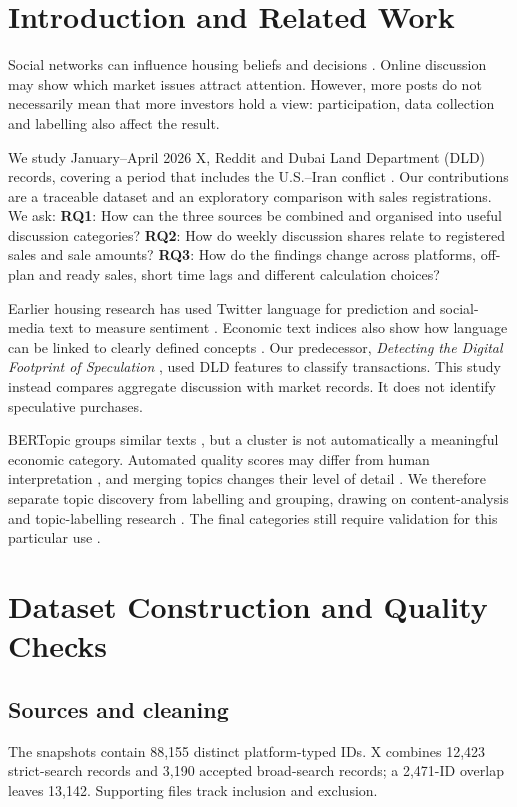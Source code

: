\documentclass[graybox]{svmult}
\begin{document}
\section{Introduction and Related Work}
Social networks can influence housing beliefs and decisions \cite{bailey2018}. Online discussion may show which market issues attract attention. However, more posts do not necessarily mean that more investors hold a view: participation, data collection and labelling also affect the result.

We study January--April 2026 X, Reddit and Dubai Land Department (DLD) records, covering a period that includes the U.S.--Iran conflict \cite{crs2026}. Our contributions are a traceable dataset and an exploratory comparison with sales registrations. We ask:
\textbf{RQ1}: How can the three sources be combined and organised into useful discussion categories?
\textbf{RQ2}: How do weekly discussion shares relate to registered sales and sale amounts?
\textbf{RQ3}: How do the findings change across platforms, off-plan and ready sales, short time lags and different calculation choices?

Earlier housing research has used Twitter language for prediction \cite{zamani} and social-media text to measure sentiment \cite{housing2023}. Economic text indices also show how language can be linked to clearly defined concepts \cite{baker2016}. Our predecessor, \emph{Detecting the Digital Footprint of Speculation} \cite{speculation}, used DLD features to classify transactions. This study instead compares aggregate discussion with market records. It does not identify speculative purchases.

BERTopic groups similar texts \cite{bertopic}, but a cluster is not automatically a meaningful economic category. Automated quality scores may differ from human interpretation \cite{hoyle}, and merging topics changes their level of detail \cite{janssens}. We therefore separate topic discovery from labelling and grouping, drawing on content-analysis and topic-labelling research \cite{hsieh2005,topicgpt}. The final categories still require validation for this particular use \cite{grimmer2013}.

\section{Dataset Construction and Quality Checks}
\subsection{Sources and cleaning}
The snapshots contain 88,155 distinct platform-typed IDs. X combines 12,423 strict-search records and 3,190 accepted broad-search records; a 2,471-ID overlap leaves 13,142. Supporting files track inclusion and exclusion.
\end{document}

